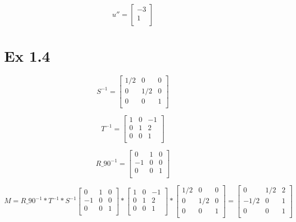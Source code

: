 \documentclass{article}
\begin{document}
\[
    u'' =
    \begin{bmatrix}
        -3 \\
        1  \\
    \end{bmatrix}
\]
\section*{Ex 1.4}

\[
    S^{-1} =
    \begin{bmatrix}
        1/2 & 0   & 0 \\
        0   & 1/2 & 0 \\
        0   & 0   & 1 \\
    \end{bmatrix}
\]


\[
    T^{-1} =
    \begin{bmatrix}
        1 & 0 & -1 \\
        0 & 1 & 2  \\
        0 & 0 & 1  \\
    \end{bmatrix}
\]


\[
    R\_90^{-1} =
    \begin{bmatrix}
        0  & 1 & 0 \\
        -1 & 0 & 0 \\
        0  & 0 & 1 \\
    \end{bmatrix}
\]


\[
    M = R\_90^{-1} * T^{-1} * S^{-1}
    \begin{bmatrix}
        0  & 1 & 0 \\
        -1 & 0 & 0 \\
        0  & 0 & 1 \\
    \end{bmatrix}
    *
    \begin{bmatrix}
        1 & 0 & -1 \\
        0 & 1 & 2  \\
        0 & 0 & 1  \\
    \end{bmatrix}
    *
    \begin{bmatrix}
        1/2 & 0   & 0 \\
        0   & 1/2 & 0 \\
        0   & 0   & 1 \\
    \end{bmatrix}
    =
    \begin{bmatrix}
        0    & 1/2 & 2 \\
        -1/2 & 0   & 1 \\
        0    & 0   & 1 \\
    \end{bmatrix}
\]
\end{document}
